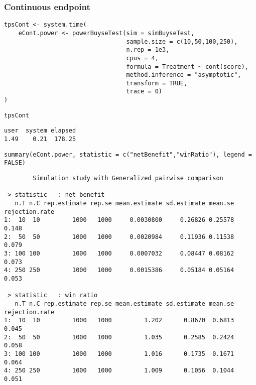 \documentclass[12pt]{article}
\begin{document}
\clearpage

\subsubsection{Continuous endpoint}
\label{sec:orgabe5f59}
\lstset{language=r,label= ,caption= ,captionpos=b,numbers=none}
\begin{lstlisting}
tpsCont <- system.time(
	eCont.power <- powerBuyseTest(sim = simBuyseTest, 
								  sample.size = c(10,50,100,250), 
								  n.rep = 1e3,
								  cpus = 4,
								  formula = Treatment ~ cont(score), 
								  method.inference = "asymptotic",
								  transform = TRUE,
								  trace = 0)
)
\end{lstlisting}

\lstset{language=r,label= ,caption= ,captionpos=b,numbers=none}
\begin{lstlisting}
tpsCont
\end{lstlisting}

\begin{verbatim}
user  system elapsed 
1.49    0.21  178.25
\end{verbatim}

\lstset{language=r,label= ,caption= ,captionpos=b,numbers=none}
\begin{lstlisting}
summary(eCont.power, statistic = c("netBenefit","winRatio"), legend = FALSE)
\end{lstlisting}

\begin{verbatim}
        Simulation study with Generalized pairwise comparison

 > statistic   : net benefit
   n.T n.C rep.estimate rep.se mean.estimate sd.estimate mean.se rejection.rate
1:  10  10         1000   1000     0.0030800     0.26826 0.25578          0.148
2:  50  50         1000   1000     0.0020984     0.11936 0.11538          0.079
3: 100 100         1000   1000     0.0007032     0.08447 0.08162          0.073
4: 250 250         1000   1000     0.0015386     0.05184 0.05164          0.053

 > statistic   : win ratio
   n.T n.C rep.estimate rep.se mean.estimate sd.estimate mean.se rejection.rate
1:  10  10         1000   1000         1.202      0.8670  0.6813          0.045
2:  50  50         1000   1000         1.035      0.2585  0.2424          0.058
3: 100 100         1000   1000         1.016      0.1735  0.1671          0.064
4: 250 250         1000   1000         1.009      0.1056  0.1044          0.051
\end{verbatim}
\end{document}
